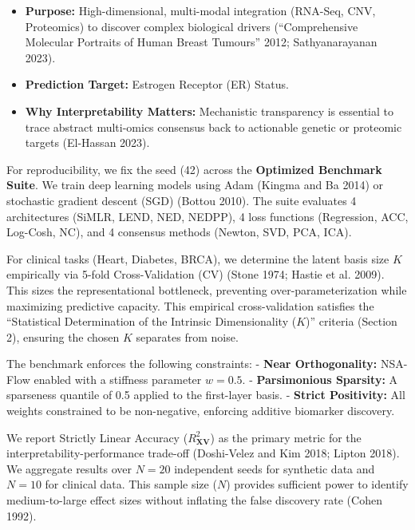 \documentclass[
  letterpaper,
]{report}
\providecommand{\tightlist}{%
  \setlength{\itemsep}{0pt}\setlength{\parskip}{0pt}}
\begin{document}
\begin{enumerate}
  \begin{itemize}
  \tightlist
  \item
    \textbf{Purpose:} High-dimensional, multi-modal integration
    (RNA-Seq, CNV, Proteomics) to discover complex biological drivers
    ({``Comprehensive Molecular Portraits of Human Breast Tumours''}
    2012; Sathyanarayanan 2023).
  \item
    \textbf{Prediction Target:} Estrogen Receptor (ER) Status.
  \item
    \textbf{Why Interpretability Matters:} Mechanistic transparency is
    essential to trace abstract multi-omics consensus back to actionable
    genetic or proteomic targets (El-Hassan 2023).
  \end{itemize}
\end{enumerate}

For reproducibility, we fix the seed (42) across the \textbf{Optimized
Benchmark Suite}. We train deep learning models using Adam (Kingma and
Ba 2014) or stochastic gradient descent (SGD) (Bottou 2010). The suite
evaluates 4 architectures (SiMLR, LEND, NED, NEDPP), 4 loss functions
(Regression, ACC, Log-Cosh, NC), and 4 consensus methods (Newton, SVD,
PCA, ICA).

For clinical tasks (Heart, Diabetes, BRCA), we determine the latent
basis size \(K\) empirically via 5-fold Cross-Validation (CV) (Stone
1974; Hastie et al. 2009). This sizes the representational bottleneck,
preventing over-parameterization while maximizing predictive capacity.
This empirical cross-validation satisfies the ``Statistical
Determination of the Intrinsic Dimensionality (\(K\))'' criteria
(Section 2), ensuring the chosen \(K\) separates from noise.

The benchmark enforces the following constraints: - \textbf{Near
Orthogonality:} NSA-Flow enabled with a stiffness parameter \(w=0.5\). -
\textbf{Parsimonious Sparsity:} A sparseness quantile of 0.5 applied to
the first-layer basis. - \textbf{Strict Positivity:} All weights
constrained to be non-negative, enforcing additive biomarker discovery.

We report Strictly Linear Accuracy (\(R^2_{\mathbf{X}\mathbf{V}}\)) as
the primary metric for the interpretability-performance trade-off
(Doshi-Velez and Kim 2018; Lipton 2018). We aggregate results over
\(N=20\) independent seeds for synthetic data and \(N=10\) for clinical
data. This sample size (\(N\)) provides sufficient power to identify
medium-to-large effect sizes without inflating the false discovery rate
(Cohen 1992).
\end{document}

